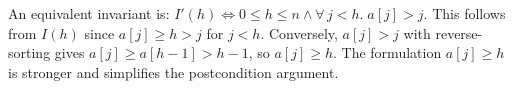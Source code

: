 \begin{remark}
An equivalent invariant is:
$I'(h) \iff 0 \leq h \leq n \wedge \forall\, j < h.\; a[j] > j$.
This follows from $I(h)$ since $a[j] \geq h > j$ for $j < h$.
Conversely, $a[j] > j$ with reverse-sorting gives $a[j] \geq a[h{-}1] > h{-}1$,
so $a[j] \geq h$. The formulation $a[j] \geq h$ is stronger and simplifies
the postcondition argument.
\end{remark}
